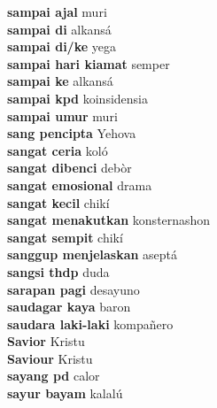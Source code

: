 \textbf{ sampai ajal  } muri \\
\textbf{ sampai di  } alkansá \\
\textbf{ sampai di/ke  } yega \\
\textbf{ sampai hari kiamat  } semper \\
\textbf{ sampai ke  } alkansá \\
\textbf{ sampai kpd  } koinsidensia \\
\textbf{ sampai umur  } muri \\
\textbf{ sang pencipta  } Yehova \\
\textbf{ sangat ceria  } koló \\
\textbf{ sangat dibenci  } debòr \\
\textbf{ sangat emosional  } drama \\
\textbf{ sangat kecil  } chikí \\
\textbf{ sangat menakutkan  } konsternashon \\
\textbf{ sangat sempit  } chikí \\
\textbf{ sanggup menjelaskan  } aseptá \\
\textbf{ sangsi thdp  } duda \\
\textbf{ sarapan pagi  } desayuno \\
\textbf{ saudagar kaya  } baron \\
\textbf{ saudara laki-laki  } kompañero \\
\textbf{ Savior  } Kristu \\
\textbf{ Saviour  } Kristu \\
\textbf{ sayang pd  } calor \\
\textbf{ sayur bayam  } kalalú \\
